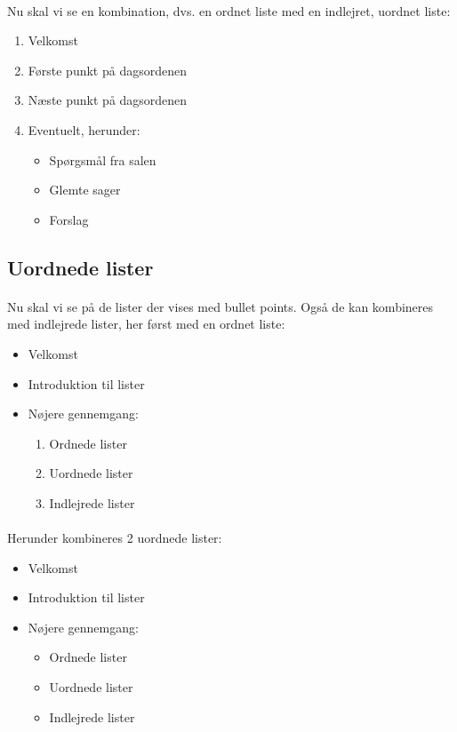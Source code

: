 \documentclass{article}
\begin{document}
\begin{enumerate}
\paragraph{}
Nu skal vi se en kombination, dvs. en ordnet liste med en indlejret, uordnet liste:
\begin{enumerate}
    \item Velkomst
    \item Første punkt på dagsordenen
    \item Næste punkt på dagsordenen
    \item Eventuelt, herunder:
    \begin{itemize}
        \item Spørgsmål fra salen
        \item Glemte sager
        \item Forslag
    \end{itemize}
\end{enumerate}
\subsection{Uordnede lister}
\paragraph{}
Nu skal vi se på de lister der vises med bullet points. Også de kan kombineres med indlejrede lister, her først med en ordnet liste:
\begin{itemize}
    \item Velkomst
    \item Introduktion til lister
    \item Nøjere gennemgang:
    \begin{enumerate}
        \item Ordnede lister
        \item Uordnede lister
        \item Indlejrede lister
    \end{enumerate}
\end{itemize}
\paragraph{}
Herunder kombineres 2 uordnede lister:
\begin{itemize}
    \item Velkomst
    \item Introduktion til lister
    \item Nøjere gennemgang:
    \begin{itemize}
        \item Ordnede lister
        \item Uordnede lister
        \item Indlejrede lister
    \end{itemize}
\end{itemize}

\end{enumerate}
\end{document}
